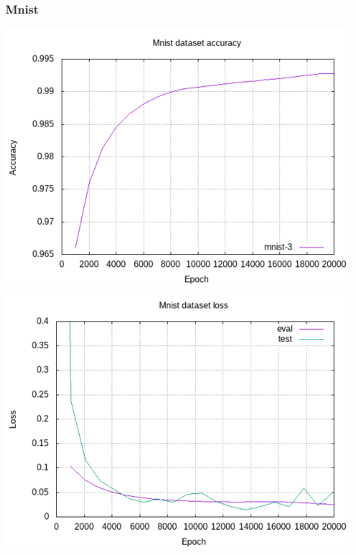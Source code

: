 \documentclass{beamer}
\begin{document}
\begin{frame}
\frametitle{Mnist}
\begin{center}
	\includegraphics[height=0.45\textheight]{mnist-accuracy}
	\includegraphics[height=0.45\textheight]{mnist-loss}
\end{center}
\end{frame}
\end{document}
